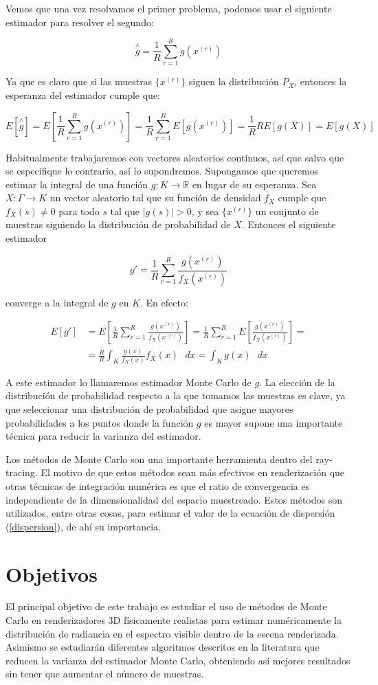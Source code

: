 Vemos que una vez resolvamos el primer problema, podemos usar el siguiente estimador para resolver el segundo:

$$\overset{\wedge}{g} = \frac{1}{R}\sum_{r=1}^R g(x^{(r)})$$

Ya que es claro que si las muestras $\{x^{(r)}\}$ siguen la distribución $P_X$, entonces la esperanza del estimador cumple que:

$$E[\overset{\wedge}{g}] = E[\frac{1}{R}\sum_{r=1}^R g(x^{(r)})] = \frac{1}{R}\sum_{r=1}^R E[g(x^{(r)})] = \frac{1}{R} R E[g(X)] = E[g(X)]$$

Habitualmente trabajaremos con vectores aleatorios continuos, así que salvo que se especifique lo contrario, así lo supondremos. Supongamos que queremos estimar la integral de una función $g:K\rightarrow \mathds{R}$ en lugar de su esperanza. Sea $X:\Gamma \rightarrow K$ un vector aleatorio tal que su función de densidad $f_X$ cumple que $f_X(s)\neq 0$ para todo $s$ tal que $|g(s)|>0$, y sea $\{x^{(r)}\}$ un conjunto de muestras siguiendo la distribución de probabilidad de $X$. Entonces el siguiente estimador 

$$g' = \frac{1}{R}\sum_{r=1}^R \frac{g(x^{(r)})}{f_X(x^{(r)})}$$

converge a la integral de $g$ en $K$. En efecto:

\begin{align*}
E[g'] &= E[\frac{1}{R}\sum_{r=1}^R \frac{g(x^{(r)})}{f_X(x^{(r)})}] = \frac{1}{R}\sum_{r=1}^R E[\frac{g(x^{(r)})}{f_X(x^{(r)})}] =\\
&= \frac{R}{R}  \int _K \frac{g(x)}{f_X(x)}f_X(x) \text{ }dx = \int _K g(x) \text{ }dx
\end{align*}

A este estimador lo llamaremos estimador Monte Carlo de $g$. La elección de la distribución de probabilidad respecto a la que tomamos las muestras es clave, ya que seleccionar una distribución de probabilidad que asigne mayores probabilidades a los puntos donde la función $g$ es mayor supone una importante técnica para reducir la varianza del estimador.

Los métodos de Monte Carlo son una importante herramienta dentro del ray-tracing. El motivo de que estos métodos sean más efectivos en renderización que otras técnicas de integración numérica es que el ratio de convergencia es independiente de la dimensionalidad del espacio muestreado. Estos métodos son utilizados, entre otras cosas, para estimar el valor de la ecuación de dispersión (\ref{dispersion}), de ahí su importancia.

\section{Objetivos}
El principal objetivo de este trabajo es estudiar el uso de métodos de Monte Carlo en renderizadores 3D físicamente realistas para estimar numéricamente la distribución de radiancia en el espectro visible dentro de la escena renderizada. Asimismo se estudiarán diferentes algoritmos descritos en la literatura que reducen la varianza del estimador Monte Carlo, obteniendo así mejores resultados sin tener que aumentar el número de muestras.



